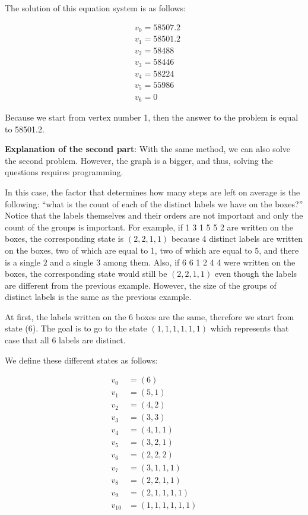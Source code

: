 \begin{solution}
The solution of this equation system is as follows:

$$
\begin{aligned}
&v_0 = 58507.2 \\
&v_1 = 58501.2 \\
&v_2 = 58488 \\
&v_3 = 58446 \\
&v_4 = 58224 \\
&v_5 = 55986 \\
&v_6 = 0
\end{aligned}
$$

Because we start from vertex number 1, then the answer to the problem is equal to 58501.2.

\textbf{Explanation of the second part}: With the same method, we can also solve the second problem. However, the  graph is a  bigger, and thus, solving the questions requires programming.

In this case, the factor that determines how many steps are left on average is the following:
``what is the count of each of the distinct labels we have on the boxes?''\\[0.2cm]
Notice that the labels themselves and their orders are not important and only the count of the groups is important.
For example, if 1 3 1 5 5 2 are written on the boxes, the corresponding state is $(2,2,1,1)$ because 4 distinct labels are written on the boxes, two of which are equal to 1, two of which are equal to 5, and there is a single  $2$ and a single $3$ among them.
Also, if 6 6 1 2 4 4 were written on the boxes, the corresponding state would still be  $(2,2,1,1)$ even though the labels are different from the previous example. However, the size of the groups of distinct labels is the same as the previous example.

At first, the labels written on the 6 boxes are the same, therefore we start from state (6). The goal is to go to the state $(1,1,1,1,1,1)$ which represents that case that all 6 labels are distinct.

We define these different states as follows:

$$
\begin{aligned}
v_0&=(6)\\
v_1&=(5,1)\\
v_2&=(4,2)\\
v_3&=(3,3)\\
v_4&=(4,1,1)\\
v_5&=(3,2,1)\\
v_6&=(2,2,2)\\
v_7&=(3,1,1,1)\\
v_8&=(2,2,1,1)\\
v_9&=(2,1,1,1,1)\\
v_{10}&=(1,1,1,1,1,1)
\end{aligned}
$$


\end{solution}
